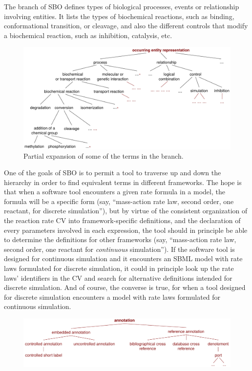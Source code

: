 The \emph{} branch of SBO defines types of biological
processes, events or relationship involving entities.  It lists
the types of biochemical reactions, such as binding,
conformational transition, or cleavage, and also the different
controls that modify a biochemical reaction, such as inhibition,
catalysis, etc.

\begin{figure}[tbh]
  \centering
  \includegraphics[scale = 0.66]{figs/sbo-interaction}
  \caption{Partial expansion of some of the terms in the \emph{} branch.}
  \label{fig:sbo-interaction}
\end{figure}

One of the goals of SBO is to permit a tool to traverse up and
down the hierarchy in order to find equivalent terms in different
frameworks.  The hope is that when a software tool encounters a
given rate formula in a model, the formula will be a specific form
(say, ``mass-action rate law, second order, one reactant, for
discrete simulation''), but by virtue of the consistent
organization of the reaction rate CV into framework-specific
definitions, and the declaration of every parameters involved in
each expression, the tool should in principle be able to determine
the definitions for other frameworks (say, ``mass-action rate law,
second order, one reactant for \emph{continuous} simulation'').
If the software tool is designed for continuous simulation and it
encounters an SBML model with rate laws formulated for discrete
simulation, it could in principle look up the rate laws'
identifiers in the CV and search for alternative definitions
intended for discrete simulation.  And of course, the converse is
true, for when a tool designed for discrete simulation encounters
a model with rate laws formulated for continuous simulation.

\begin{figure}[htb]
  \centering
  \includegraphics[scale = 0.68]{figs/sbo-annotation}
  \caption{}
  \label{fig:sbo-annotation}
\end{figure}

